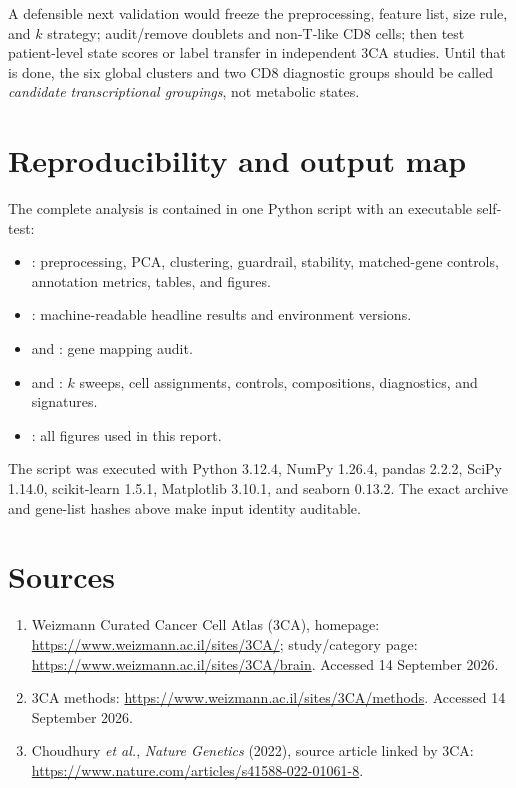 \documentclass[11pt]{article}
\begin{document}
A defensible next validation would freeze the preprocessing, feature list, size rule, and $k$ strategy; audit/remove doublets and non-T-like CD8 cells; then test patient-level state scores or label transfer in independent 3CA studies. Until that is done, the six global clusters and two CD8 diagnostic groups should be called \emph{candidate transcriptional groupings}, not metabolic states.

\section{Reproducibility and output map}

The complete analysis is contained in one Python script with an executable self-test:
\begin{itemize}
\item {}: preprocessing, PCA, clustering, guardrail, stability, matched-gene controls, annotation metrics, tables, and figures.
\item {}: machine-readable headline results and environment versions.
\item {} and : gene mapping audit.
\item {} and : $k$ sweeps, cell assignments, controls, compositions, diagnostics, and signatures.
\item {}: all figures used in this report.
\end{itemize}

The script was executed with Python 3.12.4, NumPy 1.26.4, pandas 2.2.2, SciPy 1.14.0, scikit-learn 1.5.1, Matplotlib 3.10.1, and seaborn 0.13.2. The exact archive and gene-list hashes above make input identity auditable.

\section*{Sources}

\begin{enumerate}
\item Weizmann Curated Cancer Cell Atlas (3CA), homepage: \url{https://www.weizmann.ac.il/sites/3CA/}; study/category page: \url{https://www.weizmann.ac.il/sites/3CA/brain}. Accessed 14 September 2026.
\item 3CA methods: \url{https://www.weizmann.ac.il/sites/3CA/methods}. Accessed 14 September 2026.
\item Choudhury \emph{et al.}, \emph{Nature Genetics} (2022), source article linked by 3CA: \url{https://www.nature.com/articles/s41588-022-01061-8}.
\end{enumerate}
\end{document}
